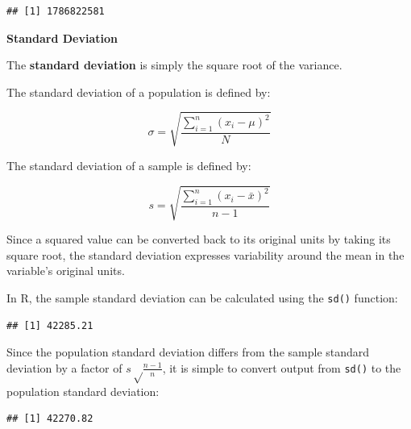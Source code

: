 \documentclass[]{book}
\newenvironment{Shaded}{\begin{snugshade}}{\end{snugshade}}
\newcommand{\CommentTok}[1]{\textcolor[rgb]{0.56,0.35,0.01}{\textit{#1}}}
\newcommand{\DecValTok}[1]{\textcolor[rgb]{0.00,0.00,0.81}{#1}}
\newcommand{\KeywordTok}[1]{\textcolor[rgb]{0.13,0.29,0.53}{\textbf{#1}}}
\newcommand{\NormalTok}[1]{#1}
\newcommand{\OperatorTok}[1]{\textcolor[rgb]{0.81,0.36,0.00}{\textbf{#1}}}
\newcommand{\StringTok}[1]{\textcolor[rgb]{0.31,0.60,0.02}{#1}}
\begin{document}
\begin{verbatim}
## [1] 1786822581
\end{verbatim}

\textbf{Standard Deviation}

The \textbf{standard deviation} is simply the square root of the variance.

The standard deviation of a population is defined by:

\[ \sigma = \sqrt{\frac{\displaystyle\sum_{i=1}^{n} (x_{i} - \mu)^{2}}{N}} \]

The standard deviation of a sample is defined by:

\[ s = \sqrt{\frac{\displaystyle\sum_{i=1}^{n} (x_{i} - \bar{x})^{2}}{n - 1}} \]

Since a squared value can be converted back to its original units by taking its square root, the standard deviation expresses variability around the mean in the variable's original units.

In R, the sample standard deviation can be calculated using the \texttt{sd()} function:

\begin{Shaded}
\end{Shaded}

\begin{verbatim}
## [1] 42285.21
\end{verbatim}

Since the population standard deviation differs from the sample standard deviation by a factor of \(s \sqrt \frac{n - 1}{n}\), it is simple to convert output from \texttt{sd()} to the population standard deviation:

\begin{Shaded}
\end{Shaded}

\begin{verbatim}
## [1] 42270.82
\end{verbatim}
\end{document}
